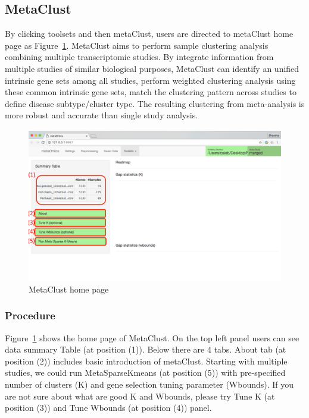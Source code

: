 \subsection{MetaClust}
By clicking toolsets and then metaClust,
users are directed to metaClust home page as Figure~\ref{fig:metaClustHome}.
MetaClust \citep{huo2016meta} aims to perform sample clustering analysis combining multiple transcriptomic studies.
By integrate information from multiple studies of similar biological purposes,
MetaClust can identify an unified intrinsic gene sets among all studies, perform weighted clustering analysis using these common intrinsic gene sets,
match the clustering pattern across studies to define disease subtype/cluster type.
The resulting clustering from meta-analysis is more robust and accurate than single study analysis.


\begin{figure}[H]
\begin{center}
\includegraphics[scale=0.4]{./figure/metaClust/metaClustHome}
\caption{MetaClust home page}
\label{fig:metaClustHome}
\end{center}
\end{figure}

\subsubsection{Procedure}

Figure~\ref{fig:metaClustHome} shows the home page of MetaClust.
On the top left panel users can see data summary Table (at position {\color{red} (1)}).
Below there are 4 tabs. 
About tab (at position {\color{red} (2)}) includes basic introduction of metaClust.
Starting with multiple studies, 
we could run MetaSparseKmeans (at position {\color{red} (5)}) with pre-specified number of clusters (K) and gene selection tuning parameter (Wbounds).
If you are not sure about what are good K and Wbounds, please try Tune K (at position {\color{red} (3)}) and Tune Wbounds (at position {\color{red} (4)}) panel.

